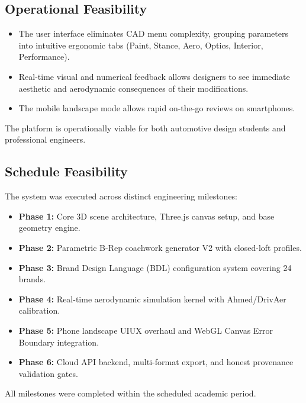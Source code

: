 \documentclass[12pt,a4paper]{report}
\begin{document}
\subsection{Operational Feasibility}
\begin{itemize}
    \item The user interface eliminates CAD menu complexity, grouping parameters into intuitive ergonomic tabs (Paint, Stance, Aero, Optics, Interior, Performance).
    \item Real-time visual and numerical feedback allows designers to see immediate aesthetic and aerodynamic consequences of their modifications.
    \item The mobile landscape mode allows rapid on-the-go reviews on smartphones.
\end{itemize}
The platform is operationally viable for both automotive design students and professional engineers.

\subsection{Schedule Feasibility}
The system was executed across distinct engineering milestones:
\begin{itemize}
    \item \textbf{Phase 1:} Core 3D scene architecture, Three.js canvas setup, and base geometry engine.
    \item \textbf{Phase 2:} Parametric B-Rep coachwork generator V2 with closed-loft profiles.
    \item \textbf{Phase 3:} Brand Design Language (BDL) configuration system covering 24 brands.
    \item \textbf{Phase 4:} Real-time aerodynamic simulation kernel with Ahmed/DrivAer calibration.
    \item \textbf{Phase 5:} Phone landscape UIUX overhaul and WebGL Canvas Error Boundary integration.
    \item \textbf{Phase 6:} Cloud API backend, multi-format export, and honest provenance validation gates.
\end{itemize}
All milestones were completed within the scheduled academic period.
\end{document}
